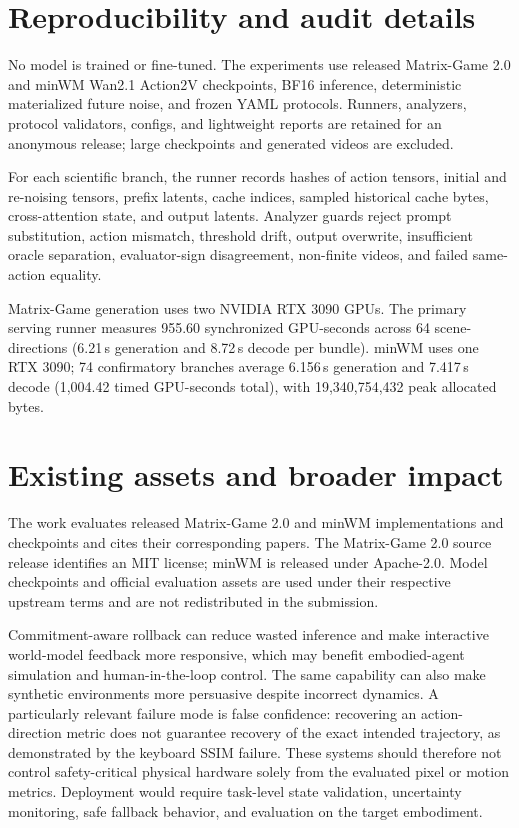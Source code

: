 \section{Reproducibility and audit details}
\label{app:repro}
\label{app:audits}
\label{app:compute}

No model is trained or fine-tuned. The experiments use released Matrix-Game
2.0 and minWM Wan2.1 Action2V checkpoints, BF16 inference, deterministic
materialized future noise, and frozen YAML protocols. Runners, analyzers,
protocol validators, configs, and lightweight reports are retained for an
anonymous release; large checkpoints and generated videos are excluded.

For each scientific branch, the runner records hashes of action tensors,
initial and re-noising tensors, prefix latents, cache indices, sampled
historical cache bytes, cross-attention state, and output latents. Analyzer
guards reject prompt substitution, action mismatch, threshold drift, output
overwrite, insufficient oracle separation, evaluator-sign disagreement,
non-finite videos, and failed same-action equality.

Matrix-Game generation uses two NVIDIA RTX 3090 GPUs. The primary serving
runner measures 955.60 synchronized GPU-seconds across 64 scene-directions
(6.21\,s generation and 8.72\,s decode per bundle). minWM uses one RTX 3090;
74 confirmatory branches average 6.156\,s generation and 7.417\,s decode
(1,004.42 timed GPU-seconds total), with 19,340,754,432 peak allocated bytes.

\section{Existing assets and broader impact}
\label{app:impact}

The work evaluates released Matrix-Game 2.0 and minWM implementations and
checkpoints and cites their corresponding papers. The Matrix-Game 2.0 source
release identifies an MIT license; minWM is released under Apache-2.0. Model
checkpoints and official evaluation assets are used under their respective
upstream terms and are not redistributed in the submission.

Commitment-aware rollback can reduce wasted inference and make interactive
world-model feedback more responsive, which may benefit embodied-agent
simulation and human-in-the-loop control. The same capability can also make
synthetic environments more persuasive despite incorrect dynamics. A
particularly relevant failure mode is false confidence: recovering an
action-direction metric does not guarantee recovery of the exact intended
trajectory, as demonstrated by the keyboard SSIM failure. These systems should
therefore not control safety-critical physical hardware solely from the
evaluated pixel or motion metrics. Deployment would require task-level state
validation, uncertainty monitoring, safe fallback behavior, and evaluation on
the target embodiment.
